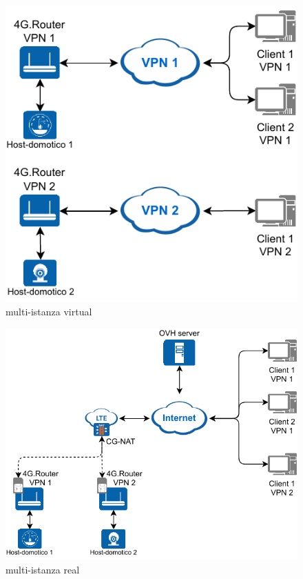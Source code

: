 \begin{figure}[h]
    \centering
    \includegraphics[width=0.6\linewidth]{immagini/diag2-multiistanza_virtual}
    \caption{multi-istanza virtual}
    \label{fig:diag2-multiistanza_virtual}
\end{figure}


\begin{figure}
    \centering
    \includegraphics[width=0.8\linewidth]{immagini/diag2-multiistanza_real}
    \caption{multi-istanza real}
    \label{fig:diag2-multiistanza_real}
\end{figure}

\todo[espandi!!!]

